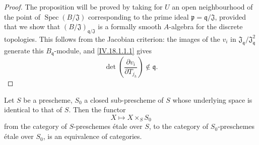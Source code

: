 \begin{proof}
The proposition will be proved by taking for $U$ an open neighbourhood of the point of $\operatorname{Spec}(B/\mathfrak{J})$ corresponding to the prime ideal $\mathfrak p=\mathfrak q/\mathfrak{J}$, provided that we show that $(B/\mathfrak{J})_{\mathfrak q/\mathfrak{J}}$ is a formally smooth $A$-algebra for the discrete topologies.  This follows from the Jacobian criterion: the images of the $v_i$ in $\mathfrak{J}_{\mathfrak q}/\mathfrak{J}_{\mathfrak q}^2$ generate this $B_{\mathfrak q}$-module, and \eqref{IV.18.1.1.1} gives
\[
 \det\left(\frac{\partial v_i}{\partial T_{j_h}}\right)\notin\mathfrak q.
\]
\end{proof}

\begin{theorem}[18.1.2]
\label{IV.18.1.2}
Let $S$ be a prescheme, $S_0$ a closed sub-prescheme of $S$ whose underlying space is identical to that of $S$.
Then the functor
\[
X\mapsto X\times_S S_0
\]
from the category of $S$-preschemes \'etale over $S$, to the category of $S_0$-preschemes \'etale over $S_0$, is an equivalence of categories.
\end{theorem}

